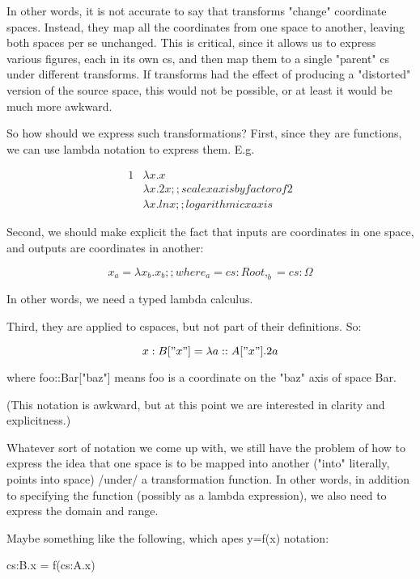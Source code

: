 \documentclass[12pt]{tufte-handout}
\numberwithin{equation}{subsection}
\numberwithin{equation}{subsection}
\begin{document}
  In other words, it is not accurate to say that transforms "change"
  coordinate spaces.  Instead, they map all the coordinates from one
  space to another, leaving both spaces per se unchanged.  This is
  critical, since it allows us to express various figures, each in its
  own cs, and then map them to a single "parent" cs under different
  transforms.  If transforms had the effect of producing a "distorted"
  version of the source space, this would not be possible, or at least
  it would be much more awkward.

  So how should we express such transformations?  First, since they are
  functions, we can use lambda notation to express them.  E.g.

  {
    \begin{alignat}{1}
      & \lambda x.x \\
      & \lambda x.2x   ;; scale x axis by factor of 2 \\
      & \lambda x.ln x ;; logarithmic x axis
    \end{alignat}
  }

  Second, we should make explicit the fact that inputs are coordinates
  in one space, and outputs are coordinates in another:

  $$x_a = \lambda x_b.x_b  ;; where _a = cs:Root, _b = cs:\Omega$$

  In other words, we need a typed lambda calculus.

  Third, they are applied to cspaces, but not part of their definitions.
  So:

  \begin{equation}
    x:B["x"] = \lambda a::A["x"].2a
  \end{equation}


  where foo::Bar["baz"] means foo is a coordinate on the "baz" axis of space Bar.

  (This notation is awkward, but at this point we are interested in
  clarity and explicitness.)

  Whatever sort of notation we come up with, we still have the problem
  of how to express the idea that one space is to be mapped into another
  ("into" literally, points into space) /under/ a transformation
  function.  In other words, in addition to specifying the function
  (possibly as a lambda expression), we also need to express the domain
  and range.

  Maybe something like the following, which apes y=f(x) notation:

  cs:B.x = f(cs:A.x)
\end{document}

